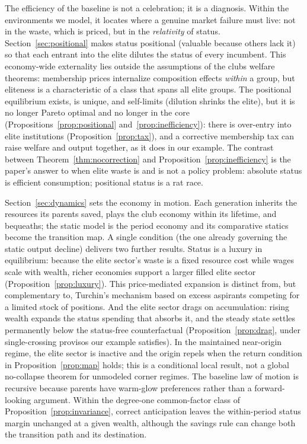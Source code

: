 \documentclass[12pt,letterpaper]{article}
\theoremstyle{definition}
\begin{document}
The efficiency of the baseline is not a celebration; it is a diagnosis.
Within the environments we model, it locates where a genuine market failure must live: not in the waste, which is priced, but in the \emph{relativity} of status.
Section~\ref{sec:positional} makes status positional (valuable because others lack it) so that each entrant into the elite dilutes the status of every incumbent.
This economy-wide externality lies outside the assumptions of the clubs welfare theorems: membership prices internalize composition effects \emph{within} a group, but eliteness is a characteristic of a class that spans all elite groups.
The positional equilibrium exists, is unique, and self-limits (dilution shrinks the elite), but it is no longer Pareto optimal and no longer in the core (Propositions~\ref{prop:positional} and~\ref{prop:inefficiency}): there is over-entry into elite institutions (Proposition~\ref{prop:tax}), and a corrective membership tax can raise welfare and output together, as it does in our example.
The contrast between Theorem~\ref{thm:nocorrection} and Proposition~\ref{prop:inefficiency} is the paper's answer to when elite waste is and is not a policy problem: absolute status is efficient consumption; positional status is a rat race.

Section~\ref{sec:dynamics} sets the economy in motion.
Each generation inherits the resources its parents saved, plays the club economy within its lifetime, and bequeaths; the static model is the period economy and its comparative statics become the transition map.
A single condition (the one already governing the static output decline) delivers two further results.
Status is a luxury in equilibrium: because the elite sector's waste is a fixed resource cost while wages scale with wealth, richer economies support a larger filled elite sector (Proposition~\ref{prop:luxury}).
This price-mediated expansion is distinct from, but complementary to, Turchin's mechanism based on excess aspirants competing for a limited stock of positions.
And the elite sector drags on accumulation: rising wealth expands the status spending that absorbs it, and the steady state settles permanently below the status-free counterfactual (Proposition~\ref{prop:drag}, under single-crossing provisos our example satisfies).
In the maintained near-origin regime, the elite sector is inactive and the origin repels when the return condition in Proposition~\ref{prop:map} holds; this is a conditional local result, not a global no-collapse theorem for unmodeled corner regimes.
The baseline law of motion is recursive because parents have warm-glow preferences rather than a forward-looking argument.
Within the degree-one common-factor class of Proposition~\ref{prop:invariance}, correct anticipation leaves the within-period status margin unchanged at a given wealth, although the savings rule can change both the transition path and its destination.
\end{document}
